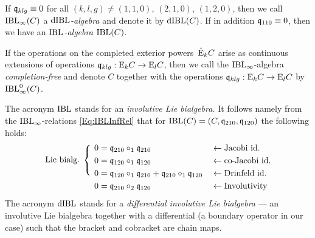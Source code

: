 \documentclass[\MainFolder/Text.tex]{subfiles}
\begin{document}
\begin{Def}
If $\mathfrak{q}_{klg} \equiv 0$ for all $(k,l,g)\neq (1,1,0)$, $(2,1,0)$, $(1,2,0)$, then we call $\mathrm{IBL}_\infty(C)$ a \emph{$\mathrm{dIBL}$-algebra} and denote it by $\mathrm{dIBL}(C)$. If in addition $\mathfrak{q}_{110} \equiv 0$, then we have an \emph{$\mathrm{IBL}$-algebra} $\mathrm{IBL}(C)$.

If the operations on the completed exterior powers~$\hat{\mathrm{E}}_k C$ arise as continuous extensions of operations $\mathfrak{q}_{klg}: \mathrm{E}_k C \rightarrow \mathrm{E}_l C$, then we call the $\mathrm{IBL}_\infty$-algebra \emph{completion-free} and denote $C$ together with the operations $\mathfrak{q}_{klg}: \mathrm{E}_k C \rightarrow \mathrm{E}_l C$ by $\mathrm{IBL}_\infty^0(C)$.
\end{Def}

The acronym $\mathrm{IBL}$ stands for an \emph{involutive Lie bialgebra.} It follows namely from the $\mathrm{IBL}_\infty$-relations \eqref{Eq:IBLInfRel} that for $\mathrm{IBL}(C) = (C,\mathfrak{q}_{210},\mathfrak{q}_{120})$ the following holds: 
\begin{equation*}
\raisebox{2ex}{$\text{Lie bialg.}\;\left\{\rule{0pt}{5ex}\right.$}\;
\begin{aligned}   
   0&= \OPQ_{210}\circ_1 \OPQ_{210} &&\leftarrow\text{Jacobi id.}\\
   0 &= \OPQ_{120} \circ_1 \OPQ_{120} &&\leftarrow\text{co-Jacobi id.}\\
   0 &= \OPQ_{120}\circ_1 \OPQ_{210} + \OPQ_{210}\circ_1 \OPQ_{120}&&\leftarrow\text{Drinfeld id.} \\
   0 &= \OPQ_{210} \circ_2 \OPQ_{120} &&\leftarrow\text{Involutivity}
\end{aligned}
\end{equation*}
The acronym $\mathrm{dIBL}$ stands for a \emph{differential involutive Lie bialgebra} --- an involutive Lie bialgebra together with a differential (a boundary operator in our case) such that the bracket and cobracket are chain maps.
 
\end{document}
